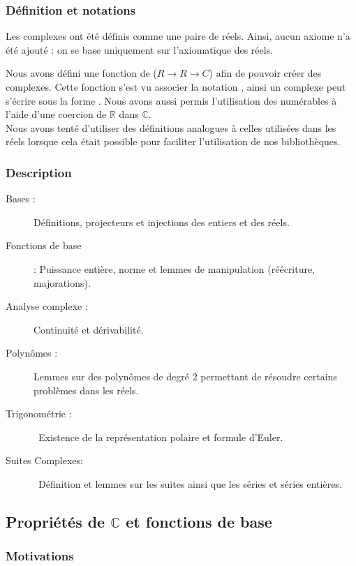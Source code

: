\subsubsection{Définition et notations}

Les complexes ont été définis comme une paire de réels. Ainsi, aucun axiome n'a été ajouté : on se base uniquement sur l'axiomatique des réels.

Nous avons défini une fonction de ($R \rightarrow R \rightarrow C$) afin de pouvoir créer des complexes. Cette fonction s'est vu associer la notation , ainsi un complexe peut s'écrire sous la forme . Nous avons aussi permis l'utilisation des numérables à l'aide d'une coercion de $\mathbb{R}$ dans $\mathbb{C}$.\\
Nous avons tenté d'utiliser des définitions analogues à celles utilisées dans les réels lorsque cela était possible pour faciliter l'utilisation de nos bibliothèques.

\subsubsection{Description}

\begin{description}
 \item [Bases :] Définitions, projecteurs et injections des entiers et des réels.
 \item [Fonctions de base] : Puissance entière, norme et lemmes de manipulation (réécriture, majorations).
 \item [Analyse complexe :] Continuité et dérivabilité.
 \item [Polynômes :] Lemmes sur des polynômes de degré 2 permettant de résoudre certains problèmes dans les réels.
 \item [Trigonométrie :] Existence de la représentation polaire et formule d'Euler.
 \item [Suites Complexes:] Définition et lemmes sur les suites ainsi que les séries et séries entières.
\end{description}

\subsection{Propriétés de $\mathbb{C}$ et fonctions de base}

\subsubsection{Motivations}

